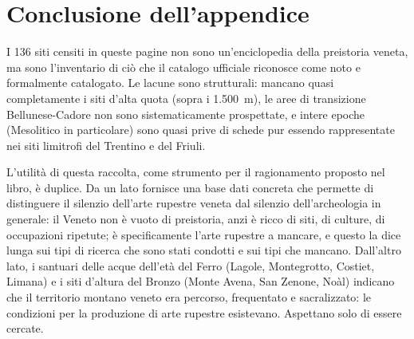 \section*{Conclusione dell'appendice}

I 136 siti censiti in queste pagine non sono un'enciclopedia della preistoria veneta, ma sono l'inventario di ciò che il catalogo ufficiale riconosce come noto e formalmente catalogato. Le lacune sono strutturali: mancano quasi completamente i siti d'alta quota (sopra i 1.500~m), le aree di transizione Bellunese-Cadore non sono sistematicamente prospettate, e intere epoche (Mesolitico in particolare) sono quasi prive di schede pur essendo rappresentate nei siti limitrofi del Trentino e del Friuli.

L'utilità di questa raccolta, come strumento per il ragionamento proposto nel libro, è duplice. Da un lato fornisce una base dati concreta che permette di distinguere il silenzio dell'arte rupestre veneta dal silenzio dell'archeologia in generale: il Veneto non è vuoto di preistoria, anzi è ricco di siti, di culture, di occupazioni ripetute; è specificamente l'arte rupestre a mancare, e questo la dice lunga sui tipi di ricerca che sono stati condotti e sui tipi che mancano. Dall'altro lato, i santuari delle acque dell'età del Ferro (Lagole, Montegrotto, Costiet, Limana) e i siti d'altura del Bronzo (Monte Avena, San Zenone, Noàl) indicano che il territorio montano veneto era percorso, frequentato e sacralizzato: le condizioni per la produzione di arte rupestre esistevano. Aspettano solo di essere cercate.
